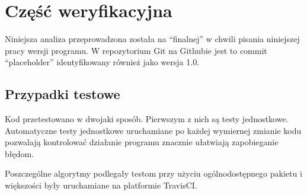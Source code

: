 \section[Weryfikacja]{Część weryfikacyjna} %
    Niniejsza analiza przeprowadzona została na ``finalnej'' w chwili pisania
    niniejszej pracy wersji programu.  W repozytorium Git na Githubie jest to
    commit ``placeholder''  identyfikowany
    również jako wersja 1.0.

    \subsection{Przypadki testowe}

    Kod przetestowano w dwojaki sposób. Pierwszym z nich są testy jednostkowe.
    Automatyczne testy jednostkowe uruchamiane po każdej wymiernej zmianie kodu
    pozwalają kontrolować działanie programu znacznie ułatwiają zapobieganie
    błędom.

    Poszczególne algorytmy podlegały testom przy użyciu ogólnodostępnego
    pakietu   i większości były
    uruchamiane na platformie TravisCI.

